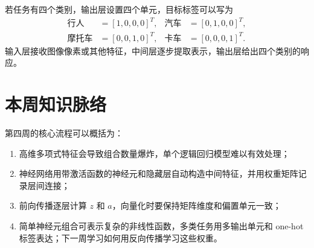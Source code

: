 \documentclass[12pt,a4paper]{ctexart}
\begin{document}
\begin{examplebox}
若任务有四个类别，输出层设置四个单元，目标标签可以写为
\begin{align*}
  \text{行人}&=[1,0,0,0]^T, & \text{汽车}&=[0,1,0,0]^T,\\
  \text{摩托车}&=[0,0,1,0]^T, & \text{卡车}&=[0,0,0,1]^T.
\end{align*}
输入层接收图像像素或其他特征，中间层逐步提取表示，输出层给出四个类别的响应。
\end{examplebox}

\section{本周知识脉络}

\begin{keybox}[从非线性表示到多类输出]
\footnotesize
第四周的核心流程可以概括为：
\begin{enumerate}
  \item 高维多项式特征会导致组合数量爆炸，单个逻辑回归模型难以有效处理；
  \item 神经网络用带激活函数的神经元和隐藏层自动构造中间特征，并用权重矩阵记录层间连接；
  \item 前向传播逐层计算 $z$ 和 $a$，向量化时要保持矩阵维度和偏置单元一致；
  \item 简单神经元组合可表示复杂的非线性函数，多类任务用多输出单元和 one-hot 标签表达；下一周学习如何用反向传播学习这些权重。
\end{enumerate}
\end{keybox}
\end{document}
